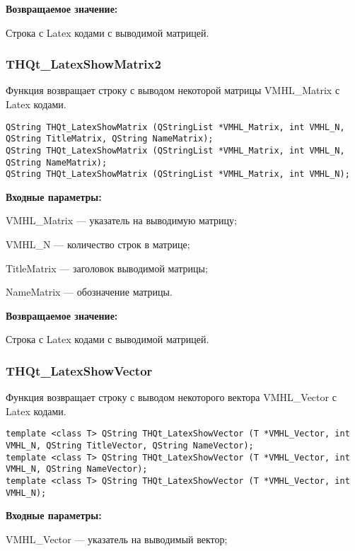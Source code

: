 \documentclass[a4paper,12pt]{article}
\begin{document}
\textbf{Возвращаемое значение:}

Строка с Latex кодами с выводимой матрицей.


\subsubsection{THQt\_LatexShowMatrix2}\label{THQt_LatexShowMatrix2}

Функция возвращает строку с выводом некоторой матрицы VMHL\_Matrix с Latex кодами.


\begin{lstlisting}[label=code_syntax_THQt_LatexShowMatrix2,caption=Синтаксис]
QString THQt_LatexShowMatrix (QStringList *VMHL_Matrix, int VMHL_N, QString TitleMatrix, QString NameMatrix);
QString THQt_LatexShowMatrix (QStringList *VMHL_Matrix, int VMHL_N, QString NameMatrix);
QString THQt_LatexShowMatrix (QStringList *VMHL_Matrix, int VMHL_N);
\end{lstlisting}

\textbf{Входные параметры:}

    VMHL\_Matrix --- указатель на выводимую матрицу;
 
    VMHL\_N --- количество строк в матрице;
 
    TitleMatrix --- заголовок выводимой матрицы;
 
    NameMatrix --- обозначение матрицы.
	
\textbf{Возвращаемое значение:}

Строка с Latex кодами с выводимой матрицей.


\subsubsection{THQt\_LatexShowVector}\label{THQt_LatexShowVector}

Функция возвращает строку с выводом некоторого вектора VMHL\_Vector с Latex кодами.


\begin{lstlisting}[label=code_syntax_THQt_LatexShowVector,caption=Синтаксис]
template <class T> QString THQt_LatexShowVector (T *VMHL_Vector, int VMHL_N, QString TitleVector, QString NameVector);
template <class T> QString THQt_LatexShowVector (T *VMHL_Vector, int VMHL_N, QString NameVector);
template <class T> QString THQt_LatexShowVector (T *VMHL_Vector, int VMHL_N);
\end{lstlisting}

\textbf{Входные параметры:}
 
    VMHL\_Vector --- указатель на выводимый вектор;
 
\end{document}
